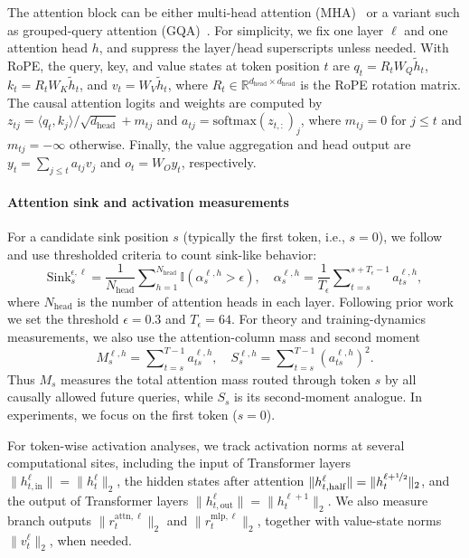 \documentclass{article}
\theoremstyle{plain}
\theoremstyle{definition}
\theoremstyle{remark}
\begin{document}
The attention block can be either multi-head attention (MHA)~\cite{vaswani2017attention} or a variant such as grouped-query attention (GQA)~\cite{ainslie2023gqa}. For simplicity, we fix one layer $\ell$ and one attention head $h$, and suppress the layer/head superscripts unless needed. With RoPE, the query, key, and value states at token position $t$ are $q_t = R_t W_Q \widetilde h_t$, $k_t = R_t W_K \widetilde h_t$, and $v_t = W_V \widetilde h_t$, where $R_t\in\mathbb{R}^{d_{\mathrm{head}}\times d_{\mathrm{head}}}$ is the RoPE rotation matrix. The causal attention logits and weights are computed by $z_{tj}=\langle q_t,k_j\rangle/\sqrt{d_{\mathrm{head}}} + m_{tj}$ and $a_{tj}=\mathrm{softmax}(z_{t,:})_j$, where $m_{tj}=0$ for $j\le t$ and $m_{tj}=-\infty$ otherwise. Finally, the value aggregation and head output are $y_t = \sum\nolimits_{j\le t} a_{tj} v_j$ and $o_t = W_O y_t$, respectively.

\paragraph{Attention sink and activation measurements}
For a candidate sink position $s$ (typically the first token, i.e., $s=0$), we follow~\cite{gu2025when,queipo-de-llano2026attention} and use thresholded criteria to count sink-like behavior:
\begin{equation}\label{eq:sink_rate}
    \mathrm{Sink}_s^{\epsilon,\ell} = \frac{1}{N_{\mathrm{head}}} \sum\nolimits_{h=1}^{N_{\mathrm{head}}} \mathbb{I}(\alpha_s^{\ell,h} > \epsilon),
    \quad
    \alpha_s^{\ell,h}=\frac{1}{T_\epsilon}\sum\nolimits_{t=s}^{s+T_\epsilon-1} a_{ts}^{\ell,h},
\end{equation}
where $N_{\mathrm{head}}$ is the number of attention heads in each layer.
Following prior work~\cite{gu2025when} we set the threshold $\epsilon=0.3$ and $T_\epsilon=64$.
For theory and training-dynamics measurements, we also use the attention-column mass and second moment
\begin{equation}\label{eq:sink_mass}
M_s^{\ell,h} = \sum\nolimits_{t=s}^{T-1} a_{ts}^{\ell,h},
\quad
S_s^{\ell,h} = \sum\nolimits_{t=s}^{T-1} (a_{ts}^{\ell,h})^2.
\end{equation}
Thus $M_s$ measures the total attention mass routed through token $s$ by all causally allowed future queries, while $S_s$ is its second-moment analogue.
In experiments, we focus on the first token ($s=0$).

For token-wise activation analyses, we track activation norms at several computational sites, including the input of Transformer layers $\|h_{t,\mathrm{in}}^\ell\|=\|h_t^\ell\|_2$, the hidden states after attention $\|h_{t,\mathrm{half}}^\ell\|=\|h_t^{\ell+\nicefrac12}\|_2$, and the output of Transformer layers $\|h_{t,\mathrm{out}}^\ell\|=\|h_t^{\ell+1}\|_2$.
We also measure branch outputs $\|r_t^{\mathrm{attn},\ell}\|_2$ and $\|r_t^{\mathrm{mlp},\ell}\|_2$, together with value-state norms $\|v_t^\ell\|_2$, when needed.
\end{document}
